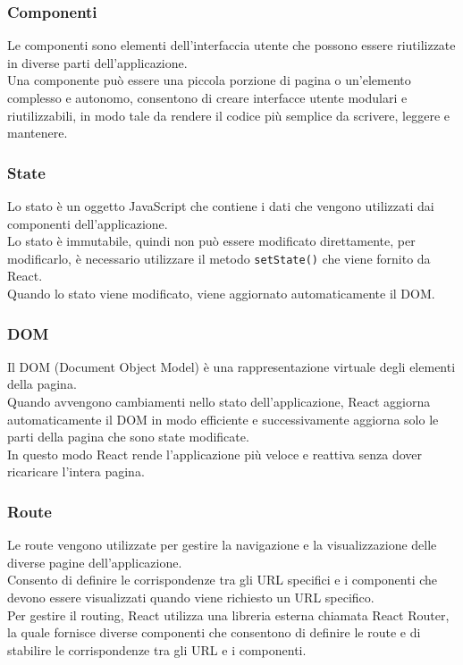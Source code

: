 \subsubsection{Componenti}
Le componenti sono elementi dell'interfaccia utente che possono essere riutilizzate in diverse parti dell'applicazione.\\
Una componente può essere una piccola porzione di pagina o un'elemento complesso e autonomo, consentono di creare interfacce utente modulari e riutilizzabili, in modo tale da rendere il codice più semplice da scrivere, leggere e mantenere.\\
\subsubsection{State}
Lo stato è un oggetto JavaScript che contiene i dati che vengono utilizzati dai componenti dell'applicazione.\\
Lo stato è immutabile, quindi non può essere modificato direttamente, per modificarlo, è necessario utilizzare il metodo \texttt{setState()} che viene fornito da React.\\
Quando lo stato viene modificato, viene aggiornato automaticamente il DOM.\\
\subsubsection{DOM}
Il DOM (Document Object Model) è una rappresentazione virtuale degli elementi della pagina.\\
Quando avvengono cambiamenti nello stato dell'applicazione, React aggiorna automaticamente il DOM in modo efficiente e successivamente aggiorna solo le parti della pagina che sono state modificate.\\
In questo modo React rende l'applicazione più veloce e reattiva senza dover ricaricare l'intera pagina.\\
\subsubsection{Route}
Le route vengono utilizzate per gestire la navigazione e la visualizzazione delle diverse pagine dell'applicazione.\\
Consento di definire le corrispondenze tra gli URL specifici e i componenti che devono essere visualizzati quando viene richiesto un URL specifico.\\
Per gestire il routing, React utilizza una libreria esterna chiamata React Router, la quale fornisce diverse componenti che consentono di definire le route e di stabilire le corrispondenze tra gli URL e i componenti.\\
